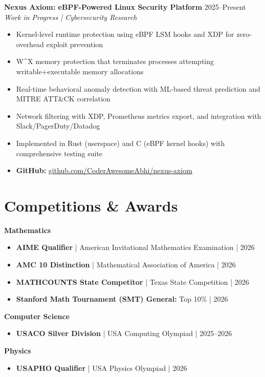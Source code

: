 \documentclass[11pt,letterpaper]{article}
\begin{document}
\textbf{Nexus Axiom: eBPF-Powered Linux Security Platform} \hfill 2025--Present\\
\textit{Work in Progress | Cybersecurity Research}
\begin{itemize}[leftmargin=1.5em,itemsep=2pt]
\item Kernel-level runtime protection using eBPF LSM hooks and XDP for zero-overhead exploit prevention
\item W\^{}X memory protection that terminates processes attempting writable+executable memory allocations
\item Real-time behavioral anomaly detection with ML-based threat prediction and MITRE ATT\&CK correlation
\item Network filtering with XDP, Prometheus metrics export, and integration with Slack/PagerDuty/Datadog
\item Implemented in Rust (userspace) and C (eBPF kernel hooks) with comprehensive testing suite
\item \textbf{GitHub:} \href{https://github.com/CoderAwesomeAbhi/nexus-axiom}{github.com/CoderAwesomeAbhi/nexus-axiom}
\end{itemize}

\section{Competitions \& Awards}

\textbf{Mathematics}
\begin{itemize}[leftmargin=1.5em,itemsep=2pt]
\item \textbf{AIME Qualifier} | American Invitational Mathematics Examination | 2026
\item \textbf{AMC 10 Distinction} | Mathematical Association of America | 2026
\item \textbf{MATHCOUNTS State Competitor} | Texas State Competition | 2026
\item \textbf{Stanford Math Tournament (SMT) General:} Top 10\% | 2026
\end{itemize}

\textbf{Computer Science}
\begin{itemize}[leftmargin=1.5em,itemsep=2pt]
\item \textbf{USACO Silver Division} | USA Computing Olympiad | 2025--2026
\end{itemize}

\textbf{Physics}
\begin{itemize}[leftmargin=1.5em,itemsep=2pt]
\item \textbf{USAPHO Qualifier} | USA Physics Olympiad | 2026
\end{itemize}
\end{document}
